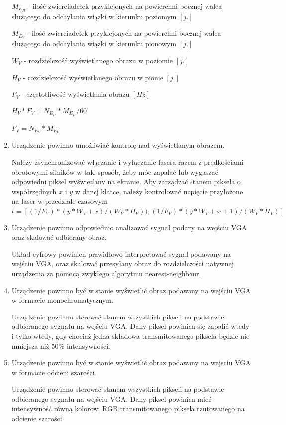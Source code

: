 \documentclass[a4paper,oneside,11pt]{report}
\begin{document}
\begin{enumerate}[1.]
$M_E_H$ - ilość zwierciadełek przyklejonych na powierchni bocznej walca służącego do odchylania wiązki w kierunku poziomym $[j.]$

$M_E_V$ - ilość zwierciadełek przyklejonych na powierchni bocznej walca służącego do odchylania wiązki w kierunku pionowym $[j.]$

$W_V$ - rozdzielczość wyświetlanego obrazu w poziomie $[j.]$

$H_V$ - rozdzielczość wyświetlanego obrazu w pionie $[j.]$

$F_V$ - częstotliwość wyświetlania obrazu $[Hz]$

$H_V * F_V = N_E_H * M_E_H / 60$

$F_V = N_E_V * M_E_V$

\item Urządzenie powinno umożliwiać kontrolę nad wyświetlanym obrazem.

Należy zsynchronizować włączanie i wyłączanie lasera razem z prędkościami obrotowymi silników w taki sposób, żeby móc zapalać lub wygaszać odpowiedni piksel wyświetlany na ekranie. Aby zarządzać stanem piksela o współrzędnych $x$ i $y$ w danej klatce, należy kontrolować napięcie przyłożone na laser w przedziale czasowym $t = [(1 / F_V) * (y * W_V + x) / (W_V * H_V)), (1 / F_V) * (y * W_V + x + 1) / (W_V * H_V)]$

\item Urządzenie powinno odpowiednio analizować sygnał podany na wejściu VGA oraz skalować odbierany obraz.

Układ cyfrowy powinien prawidłowo interpretować sygnał podawany na wejściu VGA, oraz skalować przesyłany obraz do rozdzielczości natywnej urządzenia za pomocą zwykłego algorytmu nearest-neighbour.

\item Urządzenie powinno być w stanie wyświetlić obraz podawany na wejściu VGA w formacie monochromatycznym.

Urządzenie powinno sterować stanem wszystkich pikseli na podstawie odbieranego sygnału na wejściu VGA. Dany piksel powinien się zapalić wtedy i tylko wtedy, gdy chociaż jedna składowa transmitowanego piksela będzie nie mniejsza niż 50\% intensywności.

\item Urządzenie powinno być w stanie wyświetlić obraz podawany na wejsciu VGA w formacie odcieni szarości.

Urządzenie powinno sterować stanem wszystkich pikseli na podstawie odbieranego sygnału na wejściu VGA. Dany piksel powinien mieć intensywność równą kolorowi RGB transmitowanego piksela rzutowanego na odcienie szarości.


\end{enumerate}
\end{document}
